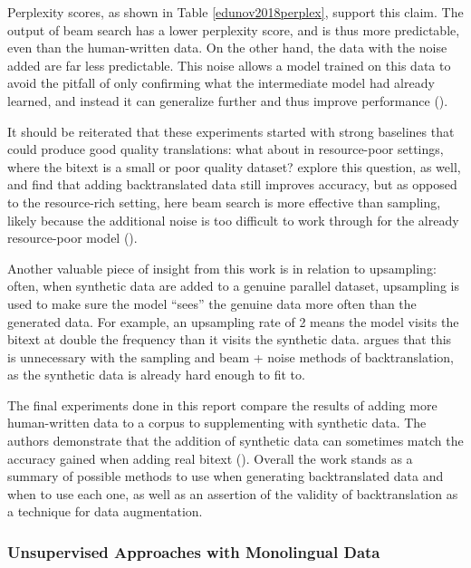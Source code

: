Perplexity scores, as shown in Table \ref{edunov2018perplex}, support this claim. The output of beam search has a lower perplexity score, and is thus more predictable, even than the human-written data. On the other hand, the data with the noise added are far less predictable. This noise allows a model trained on this data to avoid the pitfall of only confirming what the intermediate model had already learned, and instead it can generalize further and thus improve performance (\cite{edunov2018understanding}).

It should be reiterated that these experiments started with strong baselines that could produce good quality translations: what about in resource-poor settings, where the bitext is a small or poor quality dataset? \cite{edunov2018understanding} explore this question, as well, and find that adding backtranslated data still improves accuracy, but as opposed to the resource-rich setting, here beam search is more effective than sampling, likely because the additional noise is too difficult to work through for the already resource-poor model (\cite{edunov2018understanding}).

Another valuable piece of insight from this work is in relation to upsampling: often, when synthetic data are added to a genuine parallel dataset, upsampling is used to make sure the model ``sees'' the genuine data more often than the generated data. For example, an upsampling rate of 2 means the model visits the bitext at double the frequency than it visits the synthetic data. \cite{edunov2018understanding} argues that this is unnecessary with the sampling and beam + noise methods of backtranslation, as the synthetic data is already hard enough to fit to.

The final experiments done in this report compare the results of adding more human-written data to a corpus to supplementing with synthetic data. The authors demonstrate that the addition of synthetic data can sometimes match the accuracy gained when adding real bitext (\cite{edunov2018understanding}). Overall the work stands as a summary of possible methods to use when generating backtranslated data and when to use each one, as well as an assertion of the validity of backtranslation as a technique for data augmentation.

\subsubsection{Unsupervised Approaches with Monolingual Data}

